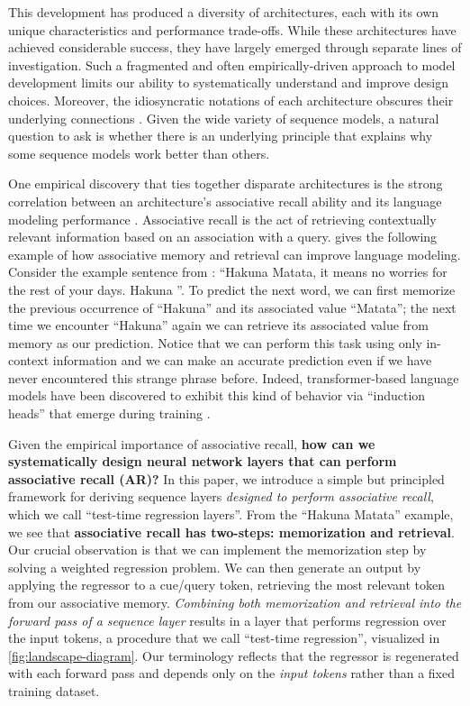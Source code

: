 \documentclass[notitlepage, 11pt]{article}
\begin{document}
This development has produced a diversity of architectures, each with its own unique characteristics and performance trade-offs.
While these architectures have achieved considerable success, they have largely emerged through separate lines of investigation.
Such a fragmented and often empirically-driven approach to model development limits our ability to systematically understand and improve design choices.
Moreover, the idiosyncratic notations of each architecture obscures their underlying connections \citep{SashaRush2024ThereAre4}.
Given the wide variety of sequence models, a natural question to ask is whether there is an underlying principle that explains why some sequence models work better than others.

One empirical discovery that ties together disparate architectures is the strong correlation between an architecture's associative recall ability and its language modeling performance \citep{Olsson2022ContextLearningInduction,Arora2023ZoologyMeasuringImproving}.
Associative recall is the act of retrieving contextually relevant information based on an association with a query.
\citep{Arora2023ZoologyMeasuringImproving} gives the following example of how associative memory and retrieval can improve language modeling.
Consider the example sentence from \citet{Arora2023LanguageModelsEnable}: ``Hakuna Matata, it means no worries for the rest of your days. Hakuna \underline{\hspace{1cm}} ''.
To predict the next word, we can first memorize the previous occurrence of ``Hakuna'' and its associated value ``Matata''; the next time we encounter ``Hakuna'' again we can retrieve its associated value from memory as our prediction.
Notice that we can perform this task using only in-context information and we can make an accurate prediction even if we have never encountered this strange phrase before.
Indeed, transformer-based language models have been discovered to exhibit this kind of behavior via ``induction heads'' that emerge during training \citep{Olsson2022ContextLearningInduction}.

Given the empirical importance of associative recall, \textbf{how can we systematically design neural network layers that can perform associative recall (AR)?}
In this paper, we introduce a simple but principled framework for deriving sequence layers \emph{designed to perform associative recall}, which we call ``test-time regression layers''.
From the ``Hakuna Matata'' example, we see that \textbf{associative recall has two-steps: memorization and retrieval}.
Our crucial observation is that we can implement the memorization step by solving a weighted regression problem.
We can then generate an output by applying the regressor to a cue/query token, retrieving the most relevant token from our associative memory.
\emph{Combining both memorization and retrieval into the forward pass of a sequence layer} results in a layer that performs regression over the input tokens, a procedure that we call ``test-time regression'', visualized in \autoref{fig:landscape-diagram}.
Our terminology reflects that the regressor is regenerated with each forward pass and depends only on the \emph{input tokens} rather than a fixed training dataset.
\end{document}
